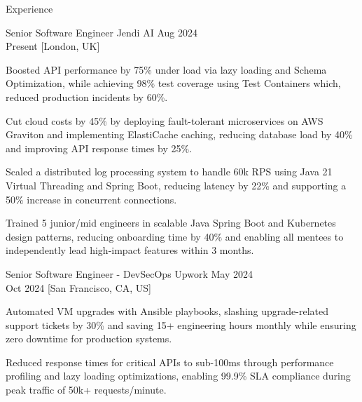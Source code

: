 \begin{rSection}{Experience}
    \begin{rSubsection}
        {Senior Software Engineer}
        {Jendi AI}
        {Aug 2024 \\ Present}
        [London, UK]
        \begin{rItemize}
            \item Boosted API performance by 75\% under load via lazy loading and Schema Optimization, while achieving 98\% test coverage using Test Containers which, reduced production incidents by 60\%.
            \item Cut cloud costs by 45\% by deploying fault-tolerant microservices on AWS Graviton and implementing ElastiCache caching, reducing database load by 40\% and improving API response times by 25\%.
            \item Scaled a distributed log processing system to handle 60k RPS using Java 21 Virtual Threading and Spring Boot, reducing latency by 22\% and supporting a 50\% increase in concurrent connections.
            \item Trained 5 junior/mid engineers in scalable Java Spring Boot and Kubernetes design patterns, reducing onboarding time by 40\% and enabling all mentees to independently lead high-impact features within 3 months.
        \end{rItemize}
    \end{rSubsection}

    \begin{rSubsection}
        {Senior Software Engineer - DevSecOps}
        {Upwork}
        {May 2024 \\ Oct 2024}
        [San Francisco, CA, US]
        \begin{rItemize}
            \item Automated VM upgrades with Ansible playbooks, slashing upgrade-related support tickets by 30\% and saving 15+ engineering hours monthly while ensuring zero downtime for production systems.
            \item Reduced response times for critical APIs to sub-100ms through performance profiling and lazy loading optimizations, enabling 99.9\% SLA compliance during peak traffic of 50k+ requests/minute.
        \end{rItemize}
    \end{rSubsection}


\end{rSection}
